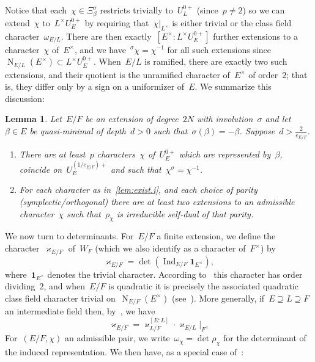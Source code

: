 \documentclass[12pt]{amsart}
\newcommand{\Ind}{\operatorname{Ind}}
\newcommand{\N}{\operatorname{N}}
\def\boI{\boldsymbol 1}
\newtheorem{lem}[thm]{Lemma}
\newtheorem{lem}[equation]{Lemma}
\begin{document}
Notice that each~$\chi\in \Xi_\beta^\sigma$ restricts trivially to~$U_L^{0+}$ (since~$p\ne 2$) so we can extend~$\chi$ to~$L^\times U^{0+}_E$ by requiring that~$\chi|_{L^\times}$ is either trivial or the class field character~$\omega_{E/L}$. There are then exactly~$[E^\times:L^\times U^{0+}_E]$ further extensions to a character~$\chi$ of~$E^\times$, and we have~${}^\sigma\chi=\chi^{-1}$ for all such extensions since~$\N_{E/L}(E^\times)\subset L^\times U^{0+}_E$. When~$E/L$ is ramified, there are exactly two such extensions, and their quotient is the unramified character of~$E^\times$ of order~$2$; that is, they differ only by a sign on a uniformizer of~$E$. We summarize this discussion:

\begin{lem}\label{lem:exist}
Let~$E/F$ be an extension of degree~$2N$ with involution~$\sigma$ and let~$\beta\in E$ be quasi-minimal of depth~$d>0$ such that~$\sigma(\beta)=-\beta$. Suppose~$d>\frac 2{e_{E/F}}$. 
\begin{enumerate}
\item\label{lem:exist.i} There are at least~$p$ characters~$\chi$ of~$U_E^{0+}$ which are represented by~$\beta$, coincide on~$U_E^{(1/e_{E/F})+}$ and such that~$\chi^{\sigma}=\chi^{-1}$.
\item\label{lem:exist.ii} For each character as in~\ref{lem:exist.i}, and each choice of parity (symplectic/orthogonal) there are at least two extensions to an admissible character~$\chi$ such that~$\rho_\chi$ is irreducible self-dual of that parity.
\end{enumerate}
\end{lem}

We now turn to determinants. For~$E/F$ a finite extension, we define the character~$\varkappa_{E/F}$ of~$W_F$ (which we also identify as a character of~$F^\times$) by 
\[
\varkappa_{E/F} = \det(\Ind_{E/F} \boI_{E^\times}),
\]
where~$\boI_{E^\times}$ denotes the trivial character. According to~\cite[\S29.2]{BH06} this character has order dividing~$2$, and when~$E/F$ is quadratic it is precisely the associated quadratic class field character trivial on~$\N_{E/F}(E^\times)$ (see~\cite[34.3~Proposition]{BH06}). More generally, if~$E\supseteq L\supseteq F$ an intermediate field then, by~\cite[(10.1.3)]{BF83}, we have
\begin{equation}\label{eqn:BF}
\varkappa_{E/F} = \varkappa_{L/F}^{[E:L]} \cdot \varkappa_{E/L}|_{F^\times}
\end{equation}
For~$(E/F,\chi)$ an admissible pair, we write~$\omega_\chi=\det\rho_\chi$ for the determinant of the induced representation. We then have, as a special case of~\cite[29.2~Proposition]{BH06}:
\end{document}
